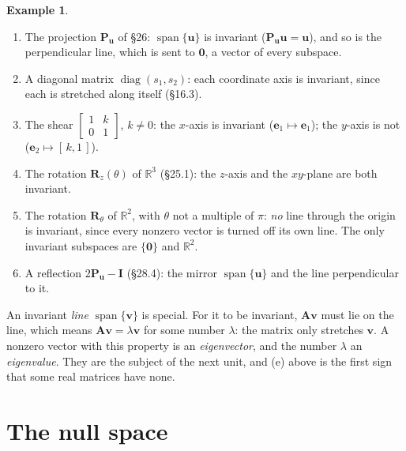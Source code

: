 \documentclass[11pt]{article}
\theoremstyle{plain}
\theoremstyle{definition}
\newtheorem{ex}{Example}[section]
\theoremstyle{remark}
\newcommand{\R}{\mathbb{R}}
\newcommand{\vc}[1]{\mathbf{#1}}
\newcommand{\mt}[1]{\mathbf{#1}}
\DeclareMathOperator{\spanop}{span}
\DeclareMathOperator{\diagop}{diag}
\begin{document}
\begin{ex}
\label{ex:invariant}
\leavevmode
\begin{enumerate}[label=(\alph*),leftmargin=2em,itemsep=3pt]
  \item The projection $\mt{P}_{\vc{u}}$ of \S26: $\spanop\{\vc{u}\}$ is
        invariant ($\mt{P}_{\vc{u}}\vc{u}=\vc{u}$), and so is the perpendicular
        line, which is sent to $\vc{0}$, a vector of every subspace.
  \item A diagonal matrix $\diagop(s_1,s_2)$: each coordinate axis is invariant,
        since each is stretched along itself (\S16.3).
  \item The shear $\begin{bmatrix}1&k\\0&1\end{bmatrix}$, $k\neq0$: the $x$-axis
        is invariant ($\vc{e}_1\mapsto\vc{e}_1$); the $y$-axis is not
        ($\vc{e}_2\mapsto[\,k,1\,]$).
  \item The rotation $\mt{R}_z(\theta)$ of $\R^{3}$ (\S25.1): the $z$-axis and the
        $xy$-plane are both invariant.
  \item The rotation $\mt{R}_\theta$ of $\R^{2}$, with $\theta$ not a multiple of
        $\pi$: \emph{no} line through the origin is invariant, since every
        nonzero vector is turned off its own line. The only invariant subspaces
        are $\{\vc{0}\}$ and $\R^{2}$.
  \item A reflection $2\mt{P}_{\vc{u}}-\mt{I}$ (\S28.4): the mirror
        $\spanop\{\vc{u}\}$ and the line perpendicular to it.
\end{enumerate}
\end{ex}

\noindent An invariant \emph{line} $\spanop\{\vc{v}\}$ is special. For it to be
invariant, $\mt{A}\vc{v}$ must lie on the line, which means
$\mt{A}\vc{v}=\lambda\vc{v}$ for some number $\lambda$: the matrix only
stretches $\vc{v}$. A nonzero vector with this property is an
\emph{eigenvector}, and the number $\lambda$ an \emph{eigenvalue}. They are the
subject of the next unit, and (e) above is the first sign that some real
matrices have none.

\section{The null space}
\end{document}
